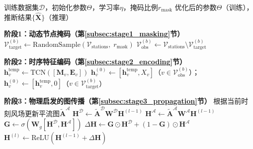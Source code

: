 \begin{algorithm}[htbp]
\caption{SPIN 模型训练与推理流程}
\caption*{\textbf{SPIN}：算法对应第\ref{sec:spin_model}节所述的四阶段数据融合与推断流程——阶段一：动态节点掩码（第\ref{subsec:stage1_masking}节），阶段二：TCN时序编码（第\ref{subsec:stage2_encoding}节），阶段三：双图传播（第\ref{subsec:stage3_propagation}节），阶段四：复合损失优化（第\ref{subsec:stage4_constraints}节）。}
\label{alg:spin}
\begin{algorithmic}[1]
    \REQUIRE 训练数据集$\mathcal{D}$，初始化参数$\Theta$，学习率$\eta$，掩码比例$r_{\text{mask}}$
    \ENSURE 优化后的参数$\Theta$（训练），推断结果$\{\hat{\mathbf{X}}\}$（推理）

        \STATE \textbf{阶段1：动态节点掩码（第\ref{subsec:stage1_masking}节）}
        \STATE $\mathcal{V}_{\text{target}}^{(b)} \leftarrow \text{RandomSample}(\mathcal{V}_{\text{stations}},\; r_{\text{mask}})$ 
        \STATE $\mathcal{V}_{\text{obs}}^{(b)} \leftarrow \mathcal{V}_{\text{stations}} \setminus \mathcal{V}_{\text{target}}^{(b)}$ 

        \STATE \textbf{阶段2：时序特征编码（第\ref{subsec:stage2_encoding}节）}
            \STATE $\mathbf{h}_v^{\text{temp}} \leftarrow \text{TCN}([\mathbf{M}_v, \mathbf{E}_v])$ 
        \ENDFOR
        \STATE $\mathbf{h}_v^{(0)} \leftarrow [\mathbf{h}_v^{\text{temp}}, X_v]$（$v \in \mathcal{V}_{\text{obs}}^{(b)}$）；$\mathbf{h}_v^{(0)} \leftarrow [\mathbf{h}_v^{\text{temp}}, 0]$（$v \in \mathcal{V}_{\text{target}}^{(b)}$） 

        \STATE \textbf{阶段3：物理启发的图传播（第\ref{subsec:stage3_propagation}节）}
        \STATE 根据当前时刻风场更新平流图$\tilde{\mathbf{A}}^{\mathcal{A}}$
            \STATE $\mathbf{H}^{\mathcal{D}} \leftarrow \tilde{\mathbf{A}}^{\mathcal{D}} \mathbf{W}^{\mathcal{D}} \mathbf{H}^{(l-1)}$ 
            \STATE $\mathbf{H}^{\mathcal{A}} \leftarrow \tilde{\mathbf{A}}^{\mathcal{A}} \mathbf{W}^{\mathcal{A}} \mathbf{H}^{(l-1)}$ 
            \STATE $\mathbf{G} \leftarrow \sigma(\mathbf{W}_g [\mathbf{H}^{\mathcal{D}}, \mathbf{H}^{\mathcal{A}}])$ 
            \STATE $\Delta\mathbf{H} \leftarrow \mathbf{G} \odot \mathbf{H}^{\mathcal{D}} + (1-\mathbf{G}) \odot \mathbf{H}^{\mathcal{A}}$ 
            \STATE $\mathbf{H}^{(l)} \leftarrow \text{ReLU}(\mathbf{H}^{(l-1)} + \Delta\mathbf{H})$ 
        \ENDFOR


\end{algorithmic}
\end{algorithm}
